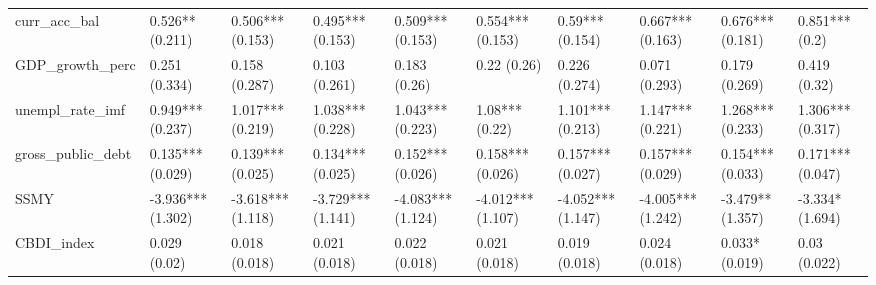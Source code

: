 \begin{table}[ht]
\begin{tabular}{llllllllll}
  curr\_acc\_bal & 0.526** (0.211) & 0.506*** (0.153) & 0.495*** (0.153) & 0.509*** (0.153) & 0.554*** (0.153) & 0.59*** (0.154) & 0.667*** (0.163) & 0.676*** (0.181) & 0.851*** (0.2) \\ 
  GDP\_growth\_perc & 0.251 (0.334) & 0.158 (0.287) & 0.103 (0.261) & 0.183 (0.26) & 0.22 (0.26) & 0.226 (0.274) & 0.071 (0.293) & 0.179 (0.269) & 0.419 (0.32) \\ 
  unempl\_rate\_imf & 0.949*** (0.237) & 1.017*** (0.219) & 1.038*** (0.228) & 1.043*** (0.223) & 1.08*** (0.22) & 1.101*** (0.213) & 1.147*** (0.221) & 1.268*** (0.233) & 1.306*** (0.317) \\ 
  gross\_public\_debt & 0.135*** (0.029) & 0.139*** (0.025) & 0.134*** (0.025) & 0.152*** (0.026) & 0.158*** (0.026) & 0.157*** (0.027) & 0.157*** (0.029) & 0.154*** (0.033) & 0.171*** (0.047) \\ 
  SSMY & -3.936*** (1.302) & -3.618*** (1.118) & -3.729*** (1.141) & -4.083*** (1.124) & -4.012*** (1.107) & -4.052*** (1.147) & -4.005*** (1.242) & -3.479** (1.357) & -3.334* (1.694) \\ 
  CBDI\_index & 0.029 (0.02) & 0.018 (0.018) & 0.021 (0.018) & 0.022 (0.018) & 0.021 (0.018) & 0.019 (0.018) & 0.024 (0.018) & 0.033* (0.019) & 0.03 (0.022) \\ 
   \bottomrule
\end{tabular}
\endgroup
\end{table}
